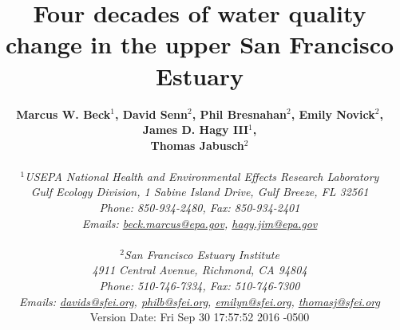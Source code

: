 \documentclass[letterpaper,12pt,oneside]{article}\usepackage[]{graphicx}\usepackage[]{color}
\begin{document}
\raggedbottom
\linenumbers
\raggedright
{}
\setlength{\parindent}{0.5in}
\renewcommand\refname{References \vspace{12pt}}

\begin{singlespace}
\title{{\bf {\Large Four decades of water quality change in the upper San Francisco Estuary}}}
\author{
  {\bf {\normalsize Marcus W. Beck$^1$, David Senn$^2$, Phil Bresnahan$^2$, Emily Novick$^2$, James D. Hagy III$^1$,}}
  \\{\bf {\normalsize Thomas Jabusch$^2$}}
  \\\\{\textit {\normalsize $^1$USEPA National Health and Environmental Effects Research Laboratory}}
  \\{\textit {\normalsize Gulf Ecology Division, 1 Sabine Island Drive, Gulf Breeze, FL 32561}}
	\\{\textit {\normalsize Phone: 850-934-2480, Fax: 850-934-2401}}
	\\{\textit {\normalsize Emails: \href{mailto:beck.marcus@epa.gov}{beck.marcus@epa.gov}, \href{mailto:hagy.jim@epa.gov}{hagy.jim@epa.gov}}}
  \\\\{\textit {\normalsize $^2$San Francisco Estuary Institute}}
	\\{\textit {\normalsize 4911 Central Avenue, Richmond, CA 94804}}
	\\{\textit {\normalsize Phone: 510-746-7334, Fax: 510-746-7300}}
	\\{\textit {\normalsize Emails: \href{mailto:davids@sfei.org}{davids@sfei.org}, \href{mailto:philb@sfei.org}{philb@sfei.org}, \href{mailto:emilyn@sfei.org}{emilyn@sfei.org}, \href{mailto:thomasj@sfei.org}{thomasj@sfei.org}}}
  \vspace{1in} 
  \\ Version Date:   Fri Sep 30 17:57:52 2016 -0500
	}
\date{}
\maketitle
\end{singlespace}
\clearpage
\end{document}
